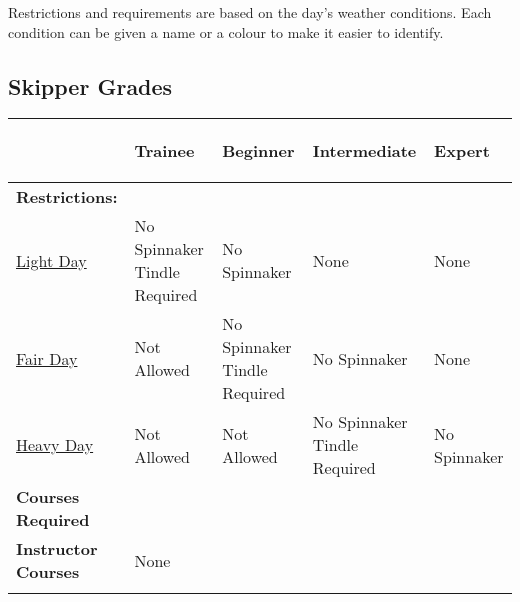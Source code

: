 \documentclass[12pt]{scrartcl}
\begin{document}
Restrictions and requirements are based on the day’s weather conditions. Each condition can be given a name or a colour to make it easier to identify.

\newpage

\begin{landscape}

	\section{Skipper Grades} \label{sec:skipper grades}

	\label{tab:skipper grades}
	\begin{tabularx}{670pt}{|X|X|X|X|X|}
		\hline
		& \hypertarget{grade:trainee}{\bfseries{Trainee}} & \hypertarget{grade:beginner}{\bfseries{Beginner}} & \hypertarget{grade:intermediate}{\bfseries{Intermediate}} & \hypertarget{grade:expert}{\bfseries{Expert}} \\
		\hline
		\bfseries{Restrictions:} & & & & \\
		\hline
		\hyperlink{condition:light day}{Light Day} & No Spinnaker \newline Tindle Required & No Spinnaker & None & None \\
		\hline
		\hyperlink{condition:fair day}{Fair Day} & Not Allowed & No Spinnaker \newline Tindle Required & No Spinnaker & None \\
		\hline
		\hyperlink{condition:heavy day}{Heavy Day} & Not Allowed & Not Allowed & No Spinnaker \newline Tindle Required & No Spinnaker \\
		\hline
		\bfseries{Courses Required} & \nameref{subsec:rigging and land skills} \newline \nameref{subsec:basic sailing 1} & \nameref{subsec:safety procedures} \newline \nameref{subsec:basic sailing 2} & \nameref{subsec:intermediate sailing} \newline \nameref{subsec:spinnaker drill} & \nameref{subsec:advanced sailing} \\
		\hline
		\bfseries{Instructor Courses} & None & \multicolumn{3}{|c|}{\nameref{subsec:powerboat operation}} \\
		& & \multicolumn{3}{|c|}{\nameref{subsec:teaching tips and techniques}} \\
		\hline
	\end{tabularx}

\end{landscape}
\end{document}
